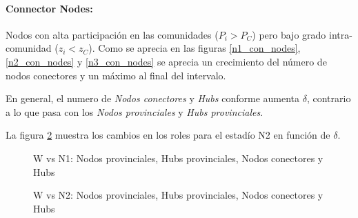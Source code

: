 \documentclass{article}
\begin{document}
\paragraph{Connector Nodes:} Nodos con alta participación en las comunidades ($P_i > P_C$) pero bajo grado intra-comunidad ($z_i < z_C$). Como se aprecia en las figuras \ref{n1_con_nodes}, \ref{n2_con_nodes} y \ref{n3_con_nodes} se aprecia un crecimiento del número de nodos conectores y un máximo al final del intervalo.

En general, el numero de \textit{Nodos conectores} y \textit{Hubs} conforme aumenta $\delta$, contrario a lo que pasa con los \textit{Nodos provinciales} y \textit{Hubs provinciales}.


La figura \ref{fig:n2_rol_cambios} muestra los cambios en los roles para el estadío N2 en función de $\delta$.


\begin{figure}[H]
    \centering
    \hfill
    \hfill
    \hfill
    \hfill
    \caption[]{W vs N1: Nodos provinciales, Hubs provinciales, Nodos conectores y Hubs\footnotemark}
    \label{fig:n1_rol_cambios}
\end{figure}

\begin{figure}[H]
    \centering
    \hfill
    \hfill
    \hfill
    \hfill
    \caption[]{W vs N2: Nodos provinciales, Hubs provinciales, Nodos conectores y Hubs\footnotemark}
    \label{fig:n2_rol_cambios}
\end{figure}
\end{document}
